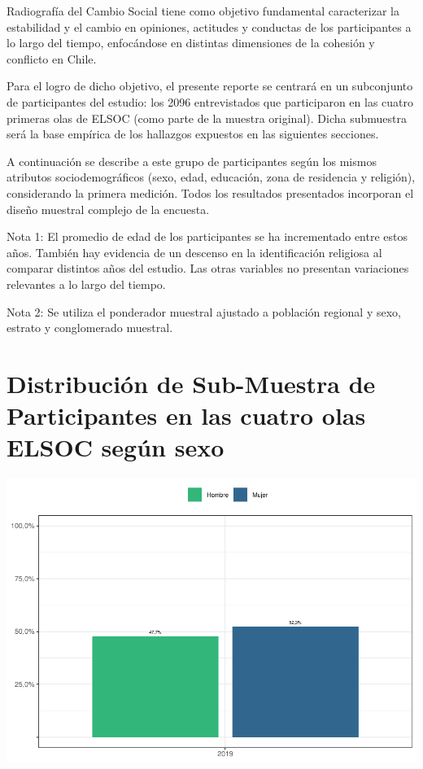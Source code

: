 \documentclass[
  12pt,
]{book}
\begin{document}
Radiografía del Cambio Social tiene como objetivo fundamental caracterizar la estabilidad y el cambio en opiniones, actitudes y conductas de los participantes a lo largo del tiempo, enfocándose en distintas dimensiones de la cohesión y conflicto en Chile.

Para el logro de dicho objetivo, el presente reporte se centrará en un subconjunto de participantes del estudio: los 2096 entrevistados que participaron en las cuatro primeras olas de ELSOC (como parte de la muestra original). Dicha submuestra será la base empírica de los hallazgos expuestos en las siguientes secciones.

A continuación se describe a este grupo de participantes según los mismos atributos sociodemográficos (sexo, edad, educación, zona de residencia y religión), considerando la primera medición. Todos los resultados presentados incorporan el diseño muestral complejo de la encuesta.

Nota 1: El promedio de edad de los participantes se ha incrementado entre estos años. También hay evidencia de un descenso en la identificación religiosa al comparar distintos años del estudio. Las otras variables no presentan variaciones relevantes a lo largo del tiempo.

Nota 2: Se utiliza el ponderador muestral ajustado a población regional y sexo, estrato y conglomerado muestral.

\hypertarget{distribuciuxf3n-de-sub-muestra-de-participantes-en-las-cuatro-olas-elsoc-seguxfan-sexo}{%
\section{Distribución de Sub-Muestra de Participantes en las cuatro olas ELSOC según sexo}\label{distribuciuxf3n-de-sub-muestra-de-participantes-en-las-cuatro-olas-elsoc-seguxfan-sexo}}

\begin{center}\includegraphics[width=0.75\linewidth]{concepto-medicion_files/figure-latex/unnamed-chunk-16-1} \end{center}
\end{document}

